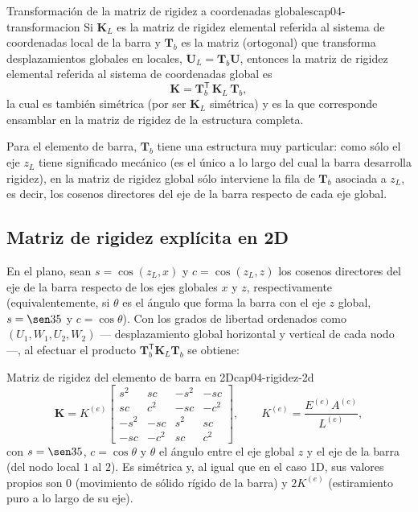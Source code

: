 \begin{ecnimportante}{Transformación de la matriz de rigidez a coordenadas globales}{cap04-transformacion}
Si $\mathbf{K}_L$ es la matriz de rigidez elemental referida al sistema de coordenadas local de la barra y $\mathbf{T}_b$ es la matriz (ortogonal) que transforma desplazamientos globales en locales, $\mathbf{U}_L=\mathbf{T}_b\mathbf{U}$, entonces la matriz de rigidez elemental referida al sistema de coordenadas global es
\[
\mathbf{K} = \mathbf{T}_b^{\mathsf T}\,\mathbf{K}_L\,\mathbf{T}_b ,
\]
la cual es también simétrica (por ser $\mathbf{K}_L$ simétrica) y es la que corresponde ensamblar en la matriz de rigidez de la estructura completa.
\end{ecnimportante}

Para el elemento de barra, $\mathbf{T}_b$ tiene una estructura muy particular: como sólo el eje $z_L$ tiene significado mecánico (es el único a lo largo del cual la barra desarrolla rigidez), en la matriz de rigidez global sólo interviene la fila de $\mathbf{T}_b$ asociada a $z_L$, es decir, los cosenos directores del eje de la barra respecto de cada eje global.

\subsection{Matriz de rigidez explícita en 2D}

En el plano, sean $s=\cos(z_L,x)$ y $c=\cos(z_L,z)$ los cosenos directores del eje de la barra respecto de los ejes globales $x$ y $z$, respectivamente (equivalentemente, si $\theta$ es el ángulo que forma la barra con el eje $z$ global, $s=\sen\theta$ y $c=\cos\theta$). Con los grados de libertad ordenados como $(U_1,W_1,U_2,W_2)$ --- desplazamiento global horizontal y vertical de cada nodo ---, al efectuar el producto $\mathbf{T}_b^{\mathsf T}\mathbf{K}_L\mathbf{T}_b$ se obtiene:

\begin{ecnimportante}{Matriz de rigidez del elemento de barra en 2D}{cap04-rigidez-2d}
\[
\mathbf{K} = K^{(e)}
\begin{bmatrix}
s^2 & sc & -s^2 & -sc \\
sc & c^2 & -sc & -c^2 \\
-s^2 & -sc & s^2 & sc \\
-sc & -c^2 & sc & c^2
\end{bmatrix}, \qquad K^{(e)}=\frac{E^{(e)}A^{(e)}}{L^{(e)}},
\]
con $s=\sen\theta$, $c=\cos\theta$ y $\theta$ el ángulo entre el eje global $z$ y el eje de la barra (del nodo local $1$ al $2$). Es simétrica y, al igual que en el caso 1D, sus valores propios son $0$ (movimiento de sólido rígido de la barra) y $2K^{(e)}$ (estiramiento puro a lo largo de su eje).
\end{ecnimportante}


